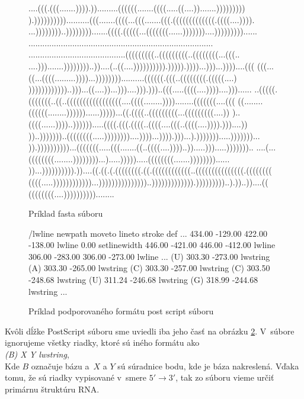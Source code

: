 \begin{figure}[H]
\begin{code}[fontsize=\scriptsize, frame=none, samepage=true]
....(((.(((.......)))).)).........((((((.......((((.....((....)).......)))))))))
).))))))))))..........(((.......((((...(((.......(((.(((((((((((((.((((....)))).
...))))))))..)))))))).......((((.(((((...(((((((......)))))))....)))))))))......
................................................................................
..........................................(((((((((..(((((((((..((((((((...(((..
....))).......))))))))..))....(..((....)))))))))).))))).))))...)))...))))....(((
(((...((...((((.........))))...))))))))..........((((((.(((..((((((((.(((((....)
))))))))))))..)))...((....))...)))....))).)))..(((.....((((....))))....)))......
..(((((.(((((((..((..(((((((((((((((((....((((........))))........(((((((....(((
((........((((((........))))))......)))))...((.((((..(((((((((...(((((((((....))
)..((((......))))..)))))).....((((.(((.((((..((((....(((..((((....)))).)))....))
))..)))))))..((((((((.....))))))))....))))...)))).)))...).))))))).....)))))))...
)).))))))))))...(((((((.....(((.......((..((((....))))..)).....))).....)))))))..
....(...((((((((........))))))))...).....))))).....((((((((.......))))))))......
))...)))))))))).))....((.((.(.((((((((.((.((((((((((((..(((((((((((((((.((((((((
((((.....))))))))))))...)))))))))))))))..))))))))))))).)))))))))..).))..))....((
((((((((....))))))))))........
  \end{code}
  \caption{Príklad fasta súboru}
  \label{obr:human_fasta}
\end{figure}

\begin{figure}[H]
\begin{code}[fontsize=\scriptsize, frame=none, samepage=true]
/lwline {newpath moveto lineto stroke} def
  ...
434.00 -129.00 422.00 -138.00 lwline
0.00 setlinewidth
446.00 -421.00 446.00 -412.00 lwline
306.00 -283.00 306.00 -273.00 lwline
  ...
(U) 303.30 -273.00 lwstring
(A) 303.30 -265.00 lwstring
(C) 303.30 -257.00 lwstring
(C) 303.50 -248.68 lwstring
(U) 311.24 -246.68 lwstring
(G) 318.99 -244.68 lwstring
  ...
\end{code}
\caption{Príklad podporovaného formátu post script súboru}
\label{obr:ps_format}
\end{figure}

Kvôli dĺžke PostScript súboru sme uviedli iba jeho časť na obrázku \ref{obr:ps_format}.
V~súbore ignorujeme všetky riadky, ktoré sú iného formátu ako
\\
\textit{(B) X Y lwstring},
\\
Kde $B$ označuje bázu a~$X$ a $Y$ sú súradnice bodu, kde je báza nakreslená.
Vďaka tomu, že sú riadky vypisované v~smere $5' \to 3'$, tak zo súboru
vieme určiť primárnu štruktúru RNA.





